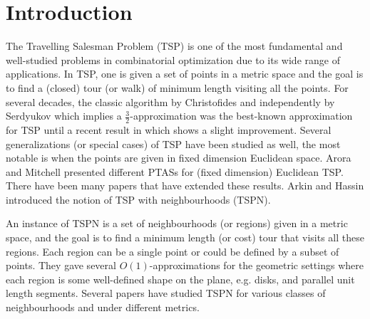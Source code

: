\documentclass[pdflatex,sn-mathphys-num]{sn-jnl}
\theoremstyle{thmstyleone}
\begin{document}
\maketitle

\newpage
\tableofcontents
\newpage


\section{Introduction}
The Travelling Salesman Problem (TSP) is one of the most fundamental and well-studied problems in combinatorial optimization due to its wide range of applications. In TSP, one is given a set of points in a metric space and the goal is to find a (closed) tour (or walk) of minimum length visiting all the points. 
For several decades, the classic algorithm by Christofides \cite{Christofides} and independently by Serdyukov \cite{Serdyukov78} which implies a $\frac{3}{2}$-approximation was the best-known approximation for TSP until a recent result in \cite{KKG22} which shows a slight improvement.
	Several generalizations (or special cases) of TSP have been studied as well, the most notable is when the points are given in fixed dimension Euclidean space. Arora and Mitchell \cite{Arora98,mitchell1999guillotine} presented different PTASs for (fixed dimension) Euclidean TSP. There have been many papers that have extended these results. Arkin and Hassin \cite{ArkinH94} introduced the notion of TSP with neighbourhoods (TSPN). 

	An instance of TSPN
	is a set of neighbourhoods (or regions) given in a metric space, and the goal is to find a minimum length (or cost) tour that visits all these regions. Each region can be a single point or could be defined by a subset of points. They gave several $O(1)$-approximations for the geometric settings
	where each region is some well-defined shape on the plane, e.g. disks, and parallel unit length segments. Several papers have studied TSPN for various classes of neighbourhoods and under different metrics.
	
\end{document}
